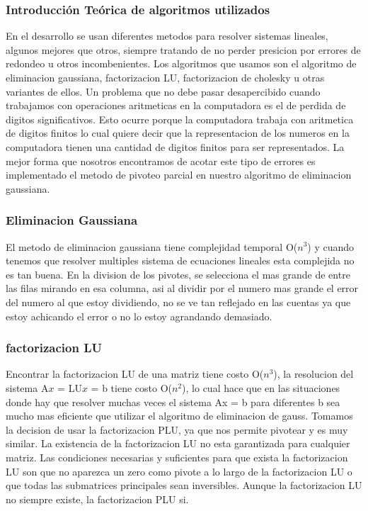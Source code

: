 \subsubsection{Introducci\'on Te\'orica de algoritmos utilizados}

En el desarrollo se usan diferentes metodos para resolver sistemas lineales, algunos mejores que otros, siempre tratando de no perder presicion por errores de redondeo u otros incombenientes.
Los algoritmos que usamos son el algoritmo de eliminacion gaussiana, factorizacion LU, factorizacion de cholesky u otras variantes de ellos.
Un problema que no debe pasar desapercibido cuando trabajamos con operaciones aritmeticas en la computadora es el de perdida de digitos significativos. Esto ocurre porque la computadora trabaja con aritmetica de digitos finitos lo cual quiere decir que la representacion de los numeros en la computadora tienen una cantidad de digitos finitos para ser representados.
La mejor forma que nosotros encontramos de acotar este tipo de errores es implementado el metodo de pivoteo parcial en nuestro algoritmo de eliminacion gaussiana.

\subsubsection{Eliminacion Gaussiana}
El metodo de eliminacion gaussiana tiene complejidad temporal O($n^{3}$) y cuando tenemos que resolver multiples sistema de ecuaciones lineales esta complejida no es tan buena.
En la division de los pivotes, se selecciona el mas grande de entre las filas mirando en esa columna, asi al dividir por el numero mas grande el error del numero al que estoy dividiendo, no se ve tan reflejado en las cuentas ya que estoy achicando el error o no lo estoy agrandando demasiado.


\subsubsection{factorizacion LU}
Encontrar la factorizacion LU de una matriz tiene costo O($n^{3}$), la resolucion del sistema A$x$ = LU$x$ = b tiene costo O($n^{2}$), lo cual hace que en las situaciones donde hay que resolver muchas veces el sistema Ax = b para diferentes b sea mucho mas eficiente que utilizar el algoritmo de eliminacion de gauss. 
Tomamos la decision de usar la factorizacion PLU, ya que nos permite pivotear y es muy similar. 
La existencia de la factorizacion LU no esta garantizada para cualquier matriz. Las condiciones necesarias y suficientes para que exista la factorizacion LU son que no aparezca un zero como pivote a lo largo de la factorizacion LU o que todas las submatrices principales sean inversibles. Aunque la factorizacion LU no siempre existe, la factorizacion PLU si.

